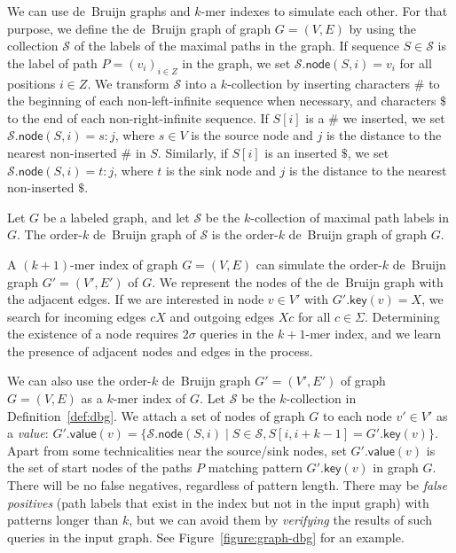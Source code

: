 \documentclass[a4paper,11pt]{llncs}
\newcommand{\set}[1]{\ensuremath{\{ #1 \}}}
\newcommand{\gkey}{\ensuremath{\mathsf{key}}}
\newcommand{\gvalue}{\ensuremath{\mathsf{value}}}
\newcommand{\gnode}{\ensuremath{\mathsf{node}}}
\newcommand{\kmer}[1]{$#1$\nobreakdash-mer}
\newcommand{\kcollection}[1]{$#1$\nobreakdash-collection}
\newcommand{\orderk}[1]{order\nobreakdash-$#1$}
\begin{document}
We can use de~Bruijn graphs and \kmer{k} indexes to simulate each other. For that purpose, we define the de~Bruijn graph of graph $G = (V, E)$ by using the collection $\mathcal{S}$ of the labels of the maximal paths in the graph. If sequence $S \in \mathcal{S}$ is the label of path $P = (v_{i})_{i \in Z}$ in the graph, we set $\mathcal{S}.\gnode(S, i) = v_{i}$ for all positions $i \in Z$. We transform $\mathcal{S}$ into a \kcollection{k} by inserting characters $\#$ to the beginning of each non-left-infinite sequence when necessary, and characters $\$$ to the end of each non-right-infinite sequence. If $S[i]$ is a $\#$ we inserted, we set $\mathcal{S}.\gnode(S, i) = s:j$, where $s \in V$ is the source node and $j$ is the distance to the nearest non-inserted $\#$ in $S$. Similarly, if $S[i]$ is an inserted $\$$, we set $\mathcal{S}.\gnode(S, i) = t:j$, where $t$ is the sink node and $j$ is the distance to the nearest non-inserted $\$$.

\begin{definition}\label{def:dbg}
Let $G$ be a labeled graph, and let $\mathcal{S}$ be the \kcollection{k} of maximal path labels in $G$. The \orderk{k} de~Bruijn graph of $\mathcal{S}$ is the \orderk{k} de~Bruijn graph of graph $G$.
\end{definition}

A \kmer{(k+1)} index of graph $G = (V, E)$ can simulate the \orderk{k} de~Bruijn graph $G' = (V', E')$ of $G$. We represent the nodes of the de~Bruijn graph with the adjacent edges. If we are interested in node $v \in V'$ with $G'.\gkey(v) = X$, we search for incoming edges $cX$ and outgoing edges $Xc$ for all $c \in \Sigma$. Determining the existence of a node requires $2 \sigma$ queries in the \kmer{k+1} index, and we learn the presence of adjacent nodes and edges in the process.

We can also use the \orderk{k} de~Bruijn graph $G' = (V', E')$ of graph $G = (V, E)$ as a \kmer{k} index of $G$. Let $\mathcal{S}$ be the \kcollection{k} in Definition~\ref{def:dbg}. We attach a set of nodes of graph $G$ to each node $v' \in V'$ as a \emph{value}: $G'.\gvalue(v) = \set{ \mathcal{S}.\gnode(S, i) \mid S \in \mathcal{S}, S[i, i+k-1] = G'.\gkey(v)}.$ Apart from some technicalities near the source/sink nodes, set $G'.\gvalue(v)$ is the set of start nodes of the paths $P$ matching pattern $G'.\gkey(v)$ in graph $G$. There will be no false negatives, regardless of pattern length. There may be \emph{false positives} (path labels that exist in the index but not in the input graph) with patterns longer than $k$, but we can avoid them by \emph{verifying} the results of such queries in the input graph. See Figure~\ref{figure:graph-dbg} for an example.
\end{document}
